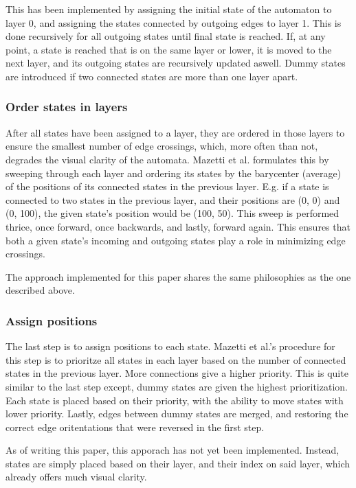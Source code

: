 This has been implemented by assigning the initial state of the automaton to layer 0, and assigning the states connected by outgoing edges to layer 1.
This is done recursively for all outgoing states until final state is reached.
If, at any point, a state is reached that is on the same layer or lower, it is moved to the next layer, and its outgoing states are recursively updated aswell.
Dummy states are introduced if two connected states are more than one layer apart.



\subsubsection{Order states in layers}
After all states have been assigned to a layer, they are ordered in those layers to ensure the smallest number of edge crossings, which, more often than not, degrades the visual clarity of the automata.
Mazetti et al. formulates this by sweeping through each layer and ordering its states by the barycenter (average) of the positions of its connected states in the previous layer.
E.g. if a state is connected to two states in the previous layer, and their positions are (0, 0) and (0, 100), the given state's position would be (100, 50).
This sweep is performed thrice, once forward, once backwards, and lastly, forward again.
This ensures that both a given state's incoming and outgoing states play a role in minimizing edge crossings. \cite*{Mazetti2012}

The approach implemented for this paper shares the same philosophies as the one described above.


\subsubsection{Assign positions}
The last step is to assign positions to each state.
Mazetti et al.'s procedure for this step is to prioritze all states in each layer based on the number of connected states in the previous layer.
More connections give a higher priority. This is quite similar to the last step except, dummy states are given the highest prioritization.
Each state is placed based on their priority, with the ability to move states with lower priority.
Lastly, edges between dummy states are merged, and restoring the correct edge oritentations that were reversed in the first step. \cite{Mazetti2012}

As of writing this paper, this apporach has not yet been implemented. Instead, states are simply placed based on their layer, and their index on said layer, which already offers much visual clarity.


